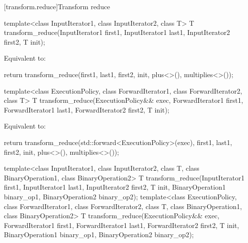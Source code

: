 [transform.reduce]{Transform reduce}
%
\begin{itemdecl}
template<class InputIterator1, class InputIterator2, class T>
  T transform_reduce(InputIterator1 first1, InputIterator1 last1,
                     InputIterator2 first2,
                     T init);
\end{itemdecl}

\begin{itemdescr}
\pnum
\effects Equivalent to:
\begin{codeblock}
return transform_reduce(first1, last1, first2, init, plus<>(), multiplies<>());
\end{codeblock}
\end{itemdescr}

%
\begin{itemdecl}
template<class ExecutionPolicy,
         class ForwardIterator1, class ForwardIterator2, class T>
  T transform_reduce(ExecutionPolicy&& exec,
                     ForwardIterator1 first1, ForwardIterator1 last1,
                     ForwardIterator2 first2,
                     T init);
\end{itemdecl}

\begin{itemdescr}
\pnum
\effects Equivalent to:
\begin{codeblock}
return transform_reduce(std::forward<ExecutionPolicy>(exec),
                        first1, last1, first2, init, plus<>(), multiplies<>());
\end{codeblock}
\end{itemdescr}

%
\begin{itemdecl}
template<class InputIterator1, class InputIterator2, class T,
         class BinaryOperation1, class BinaryOperation2>
  T transform_reduce(InputIterator1 first1, InputIterator1 last1,
                     InputIterator2 first2,
                     T init,
                     BinaryOperation1 binary_op1,
                     BinaryOperation2 binary_op2);
template<class ExecutionPolicy,
         class ForwardIterator1, class ForwardIterator2, class T,
         class BinaryOperation1, class BinaryOperation2>
  T transform_reduce(ExecutionPolicy&& exec,
                     ForwardIterator1 first1, ForwardIterator1 last1,
                     ForwardIterator2 first2,
                     T init,
                     BinaryOperation1 binary_op1,
                     BinaryOperation2 binary_op2);
\end{itemdecl}

